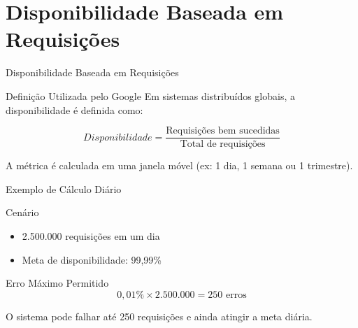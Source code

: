 \documentclass[9pt]{beamer}
\begin{document}
\section{Disponibilidade Baseada em Requisições}

\begin{frame}{Disponibilidade Baseada em Requisições}

\begin{block}{Definição Utilizada pelo Google}
Em sistemas distribuídos globais, a disponibilidade é definida como:

\[
Disponibilidade =
\frac{\text{Requisições bem sucedidas}}
{\text{Total de requisições}}
\]

A métrica é calculada em uma janela móvel
(ex: 1 dia, 1 semana ou 1 trimestre).
\end{block}

\begin{center}
\end{center}

\end{frame}
\begin{frame}{Exemplo de Cálculo Diário}

\begin{block}{Cenário}
\begin{itemize}
    \item 2.500.000 requisições em um dia
    \item Meta de disponibilidade: 99,99\%
\end{itemize}
\end{block}

\begin{block}{Erro Máximo Permitido}
\[
0,01\% \times 2.500.000 = 250 \text{ erros}
\]

O sistema pode falhar até 250 requisições
e ainda atingir a meta diária.
\end{block}

\begin{center}
\end{center}

\end{frame}
\end{document}
